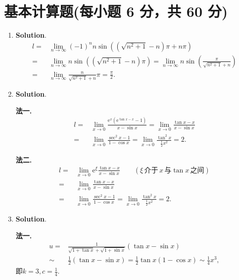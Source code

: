 \documentclass[../main.tex]{subfiles}
\begin{document}
\section{基本计算题(每小题 6 分，共 60 分)}
\begin{enumerate}
    \item \textbf{Solution}.
          \[
              \begin{aligned}
                  l= {} & \lim_{n\to\infty}(-1)^{n} n\sin\left((\sqrt{n^2+1}-n)\pi+n\pi\right)                                                    \\
                  = {}  & \lim_{n\to\infty}n\sin\left((\sqrt{n^2+1}-n)\pi\right)=\lim_{n\to\infty}n\sin\left(\frac{\pi}{\sqrt{n^2+1}+n}\right) \\
                  = {}  & \lim_{n\to\infty}\frac{n}{\sqrt{n^2+1}+n}\pi=\frac{\pi}{2}.
              \end{aligned}
          \]

    \item \textbf{Solution}.

          \textbf{法一.}
          \[
              \begin{aligned}
                  l= {} & \lim_{x\to 0}\frac{\mathrm{e}^{x}(\mathrm{e}^{\tan x -x}-1)}{x-\sin x}=\lim_{x\to0}\frac{\tan x-x}{x-\sin x} \\
                  = {}  & \lim_{x\to0}\frac{\sec ^2 x-1}{1-\cos x}=\lim_{x\to0}\frac{\tan^2 x}{\frac{1}{2}x^2}=2.
              \end{aligned}
          \]

          \textbf{法二.}
          \[
              \begin{aligned}
                  l= {} & \lim_{x\to 0}\mathrm{e}^{\xi}\frac{\tan x -x}{x-\sin x}\qquad (\xi\,\text{介于}\,x\,\text{与}\tan x\,\text{之间}) \\
                  = {}  & \lim_{x\to 0}\frac{\tan x -x}{x-\sin x}                                                                      \\
                  = {}  & \lim_{x\to0}\frac{\sec ^2 x-1}{1-\cos x}=\lim_{x\to0}\frac{\tan^2 x}{\frac{1}{2}x^2}=2.
              \end{aligned}
          \]

    \item \textbf{Solution}.

          \textbf{法一.}
          \[
              \begin{aligned}
                  u= {} & \frac{1}{\sqrt{1+\tan x}+\sqrt{1+\sin x}}(\tan x-\sin x)                    \\
                  \sim  & \frac{1}{2}(\tan x-\sin x)=\frac{1}{2}\tan x(1-\cos x)\sim\frac{1}{4}x^{3},
              \end{aligned}
          \]
          即$k=3,c=\frac{1}{4}$.


\end{enumerate}
\end{document}
